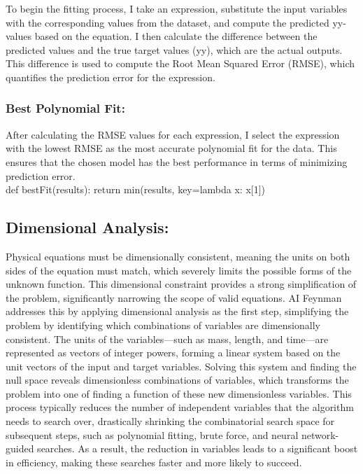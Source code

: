\documentclass{article}
\begin{document}
To begin the fitting process, I take an expression, substitute the input variables with the corresponding values from the dataset, and compute the predicted yy-values based on the equation. I then calculate the difference between the predicted values and the true target values (yy), which are the actual outputs. This difference is used to compute the Root Mean Squared Error (RMSE), which quantifies the prediction error for the expression.\\

\subsubsection{Best Polynomial Fit:}

After calculating the RMSE values for each expression, I select the expression with the lowest RMSE as the most accurate polynomial fit for the data. This ensures that the chosen model has the best performance in terms of minimizing prediction error.\\

def bestFit(results):
    return min(results, key=lambda x: x[1])



\subsection{Dimensional Analysis: }


Physical equations must be dimensionally consistent, meaning the units on both sides of the equation must match, which severely limits the possible forms of the unknown function. This dimensional constraint provides a strong simplification of the problem, significantly narrowing the scope of valid equations. AI Feynman addresses this by applying dimensional analysis as the first step, simplifying the problem by identifying which combinations of variables are dimensionally consistent. The units of the variables—such as mass, length, and time—are represented as vectors of integer powers, forming a linear system based on the unit vectors of the input and target variables. Solving this system and finding the null space reveals dimensionless combinations of variables, which transforms the problem into one of finding a function of these new dimensionless variables. This process typically reduces the number of independent variables that the algorithm needs to search over, drastically shrinking the combinatorial search space for subsequent steps, such as polynomial fitting, brute force, and neural network-guided searches. As a result, the reduction in variables leads to a significant boost in efficiency, making these searches faster and more likely to succeed.\\
\end{document}
